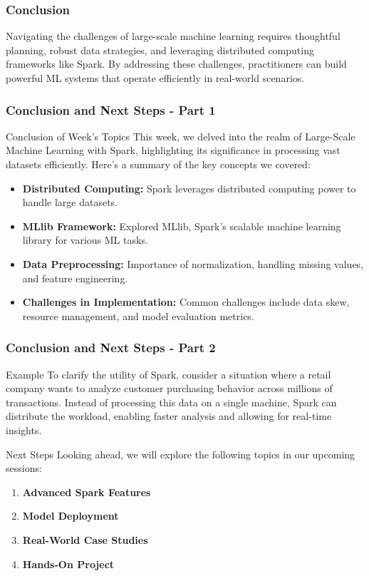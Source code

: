\documentclass[aspectratio=169]{beamer}
\begin{document}
\begin{frame}
    \frametitle{Conclusion}
    Navigating the challenges of large-scale machine learning requires thoughtful planning, robust data strategies, and leveraging distributed computing frameworks like Spark. By addressing these challenges, practitioners can build powerful ML systems that operate efficiently in real-world scenarios.
\end{frame}

\begin{frame}[fragile]
    \frametitle{Conclusion and Next Steps - Part 1}
    
    \begin{block}{Conclusion of Week's Topics}
        This week, we delved into the realm of Large-Scale Machine Learning with Spark, highlighting its significance in processing vast datasets efficiently. Here’s a summary of the key concepts we covered:
    \end{block}

    \begin{itemize}
        \item \textbf{Distributed Computing:} Spark leverages distributed computing power to handle large datasets.
        \item \textbf{MLlib Framework:} Explored MLlib, Spark's scalable machine learning library for various ML tasks.
        \item \textbf{Data Preprocessing:} Importance of normalization, handling missing values, and feature engineering.
        \item \textbf{Challenges in Implementation:} Common challenges include data skew, resource management, and model evaluation metrics.
    \end{itemize}
\end{frame}

\begin{frame}[fragile]
    \frametitle{Conclusion and Next Steps - Part 2}
    
    \begin{block}{Example}
        To clarify the utility of Spark, consider a situation where a retail company wants to analyze customer purchasing behavior across millions of transactions. Instead of processing this data on a single machine, Spark can distribute the workload, enabling faster analysis and allowing for real-time insights.
    \end{block}
    
    \begin{block}{Next Steps}
        Looking ahead, we will explore the following topics in our upcoming sessions:
    \end{block}

    \begin{enumerate}
        \item \textbf{Advanced Spark Features}
        \item \textbf{Model Deployment}
        \item \textbf{Real-World Case Studies}
        \item \textbf{Hands-On Project}
    \end{enumerate}
\end{frame}
\end{document}
